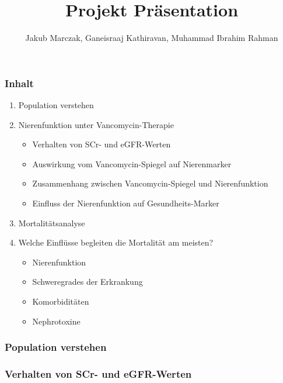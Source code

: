 \documentclass[10pt, aspectratio=169]{beamer}
\title{Projekt \MakeUppercase{\romannumeral 1}  Präsentation}
\author[J. Marczak, G. Kathiravan, M. I. Rahman]{Jakub Marczak, Ganeisraaj Kathiravan, Muhammad Ibrahim Rahman}
\begin{document}
\begin{frame}[plain]
  \titlepage
\end{frame}

\begin{frame}
    \frametitle{Inhalt}
    \begin{enumerate}
        \item Population verstehen
        \item Nierenfunktion unter Vancomycin-Therapie
        \begin{itemize} 
        \item[$\rightarrow$] Verhalten von SCr- und eGFR-Werten
        \item[$\rightarrow$] Auswirkung vom Vancomycin-Spiegel auf Nierenmarker
        \item[$\rightarrow$] Zusammenhang zwischen Vancomycin-Spiegel und Nierenfunktion
        \item[$\rightarrow$] Einfluss der Nierenfunktion auf Gesundheits-Marker
      \end{itemize}
        \item Mortalitätsanalyse
        \item[$\rightarrow$] Welche Einflüsse begleiten die Mortalität am meisten?
        \begin{itemize}
            \item Nierenfunktion
            \item Schweregrades der Erkrankung
            \item Komorbiditäten
            \item Nephrotoxine
        \end{itemize}
    \end{enumerate}
\end{frame}

\begin{frame}
    \frametitle{Population verstehen}
\end{frame}

\begin{frame}
    \frametitle{Verhalten von SCr- und eGFR-Werten}
\end{frame}
\end{document}
